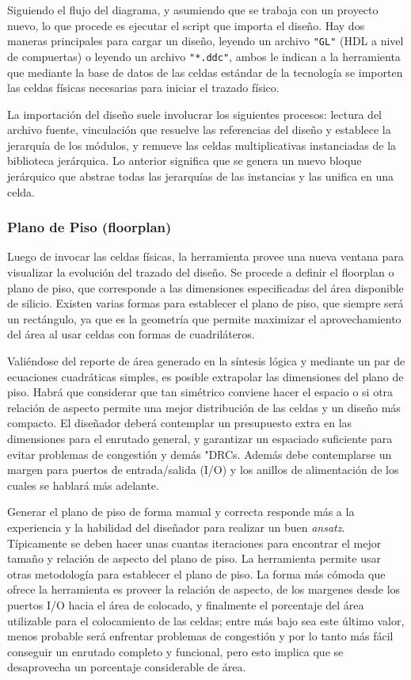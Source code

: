Siguiendo el flujo del diagrama, y asumiendo que se trabaja con un proyecto nuevo, lo que procede es ejecutar el script que importa el diseño. Hay dos maneras principales para cargar un diseño, leyendo un archivo \texttt{"GL"} (HDL a nivel de compuertas) o leyendo un archivo \texttt{"*.ddc"}, ambos le indican a la herramienta que mediante la base de datos de las celdas estándar de la tecnología se importen las celdas físicas necesarias para iniciar el trazado físico.

La importación del diseño suele involucrar los siguientes procesos: lectura del archivo fuente, vinculación que resuelve las referencias del diseño y establece la jerarquía de los módulos, y remueve las celdas multiplicativas instanciadas de la biblioteca jerárquica. Lo anterior significa que se genera un nuevo bloque jerárquico que abstrae todas las jerarquías de las instancias y las unifica en una celda.

\subsubsection{Plano de Piso (floorplan)}

Luego de invocar las celdas físicas, la herramienta provee una nueva ventana para visualizar la evolución del trazado del diseño. Se procede a definir el floorplan o plano de piso, que corresponde a las dimensiones especificadas del área disponible de silicio. Existen varias formas para establecer el plano de piso, que siempre será un rectángulo, ya que es la geometría que permite maximizar el aprovechamiento del área al usar celdas con formas de cuadriláteros.

Valiéndose del reporte de área generado en la síntesis lógica y mediante un par de ecuaciones cuadráticas simples, es posible extrapolar las dimensiones del plano de piso. Habrá que considerar que tan simétrico conviene hacer el espacio o si otra relación de aspecto permite una mejor distribución de las celdas y un diseño más compacto. El diseñador deberá contemplar un presupuesto extra en las dimensiones para el enrutado general, y garantizar un espaciado suficiente para evitar problemas de congestión y demás "DRCs. Además debe contemplarse un margen para puertos de entrada/salida (I/O) y los anillos de alimentación de los cuales se hablará más adelante.

Generar el plano de piso de forma manual y correcta responde más a la experiencia y la habilidad del diseñador para realizar un buen \textit{ansatz}. Típicamente se deben hacer unas cuantas iteraciones para encontrar el mejor tamaño y relación de aspecto del plano de piso. La herramienta permite usar otras metodología para establecer el plano de piso. La forma más cómoda que ofrece la herramienta es proveer la relación de aspecto, de los margenes desde los puertos I/O hacia el área de colocado, y finalmente el porcentaje del área utilizable para el colocamiento de las celdas; entre más bajo sea este último valor, menos probable será enfrentar problemas de congestión y por lo tanto más fácil conseguir un enrutado completo y funcional, pero esto implica que se desaprovecha un porcentaje considerable de área.

